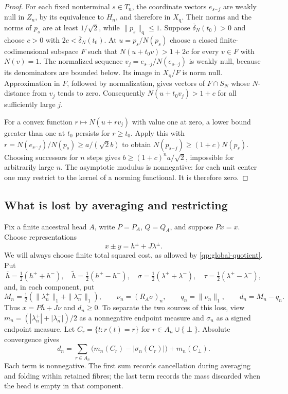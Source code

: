 \begin{proof}
For each fixed nonterminal $s\in T_n$, the coordinate vectors
$e_{s^\frown j}$ are weakly null in $Z_n$, by its equivalence to
$H_n$, and therefore in $X_{\mathrm q}$.  Their norms and the norms
of $p_s$ are at least $1/\sqrt2$, while $\|p_s\|_{\mathrm q}\le1$.
Suppose $\overline\delta_N(t_0)>0$ and choose
$c>0$ with $2c<\overline\delta_N(t_0)$.  At
$u=p_s/N(p_s)$ choose a closed finite-codimensional subspace $F$
such that $N(u+t_0v)>1+2c$ for every $v\in F$ with $N(v)=1$.
The normalized sequence $v_j=e_{s^\frown j}/N(e_{s^\frown j})$
is weakly null, because its denominators are bounded below.  Its
image in $X_{\mathrm q}/F$ is norm null.  Approximation in $F$,
followed by normalization, gives vectors of $F\cap S_N$ whose
$N$-distance from $v_j$ tends to zero.  Consequently
$N(u+t_0v_j)>1+c$ for all sufficiently large $j$.

For a convex function $r\mapsto N(u+rv_j)$ with value one at zero,
a lower bound greater than one at $t_0$ persists for $r\ge t_0$.
Apply this with
$r=N(e_{s^\frown j})/N(p_s)\ge a/(\sqrt2 b)$ to obtain
$N(p_{s^\frown j})\ge(1+c)N(p_s)$.
Choosing successors for $n$ steps gives
$b\ge (1+c)^n a/\sqrt2$, impossible for arbitrarily large $n$.
The asymptotic modulus is nonnegative: for each unit center one may
restrict to the kernel of a norming functional.  It is therefore zero.
\end{proof}

\subsection{What is lost by averaging and restricting}

Fix a finite ancestral head $A$, write $P=P_A$, $Q=Q_A$, and suppose
$Px=x$.  Choose representations
\[
 x\pm y=h^\pm+J\lambda^\pm.
\]
We will always choose finite total squared cost, as allowed by
\eqref{qp:global-quotient}.  Put
\[
 \bar h=\tfrac12(h^++h^-),\quad
 \widetilde h=\tfrac12(h^+-h^-),\quad
 \sigma=\tfrac12(\lambda^++\lambda^-),\quad
 \tau=\tfrac12(\lambda^+-\lambda^-),
\]
and, in each component, put
\[
 M_n=\tfrac12(\|\lambda_n^+\|_1+\|\lambda_n^-\|_1),\qquad
 \nu_n=(R_A\sigma)_n,\qquad q_n=\|\nu_n\|_1,\qquad
 d_n=M_n-q_n.
\]
Thus $x=P\bar h+J\nu$ and $d_n\ge0$. To separate the two sources of
this loss, view
$m_n=(|\lambda_n^+|+|\lambda_n^-|)/2$ as a nonnegative endpoint
measure and $\sigma_n$ as a signed endpoint measure. Let
$C_r=\{t:r(t)=r\}$ for $r\in A_n\cup\{\perp\}$. Absolute convergence
gives
\[
 d_n=\sum_{r\in A_n}\bigl(m_n(C_r)-|\sigma_n(C_r)|\bigr)
          +m_n(C_\perp).
\]
Each term is nonnegative. The first sum records cancellation during
averaging and folding within retained fibres; the last term records
the mass discarded when the head is empty in that component.

